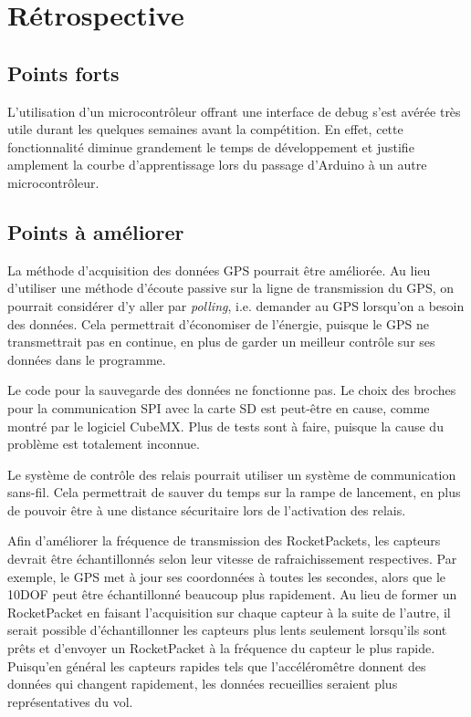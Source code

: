 \section{Rétrospective}

\subsection{Points forts}

L'utilisation d'un microcontrôleur offrant une interface de debug s'est avérée
très utile durant les quelques semaines avant la compétition. En effet, cette
fonctionnalité diminue grandement le temps de développement et justifie
amplement la courbe d'apprentissage lors du passage d'Arduino à un autre
microcontrôleur.

\subsection{Points à améliorer}

La méthode d'acquisition des données GPS pourrait être améliorée. Au lieu
d'utiliser une méthode d'écoute passive sur la ligne de transmission du GPS, on
pourrait considérer d'y aller par \textit{polling}, i.e. demander au GPS
lorsqu'on a besoin des données. Cela permettrait d'économiser de l'énergie,
puisque le GPS ne transmettrait pas en continue, en plus de garder un meilleur
contrôle sur ses données dans le programme.
\\
\par
Le code pour la sauvegarde des données ne fonctionne pas. Le choix des broches
pour la communication SPI avec la carte SD est peut-être en cause, comme montré
par le logiciel CubeMX. Plus de tests sont à faire, puisque la cause du
problème est totalement inconnue.
\\
\par
Le système de contrôle des relais pourrait utiliser un système de communication
sans-fil. Cela permettrait de sauver du temps sur la rampe de lancement, en
plus de pouvoir être à une distance sécuritaire lors de l'activation des relais.
\\
\par
Afin d'améliorer la fréquence de transmission des RocketPackets, les capteurs
devrait être échantillonnés selon leur vitesse de rafraichissement respectives.
Par exemple, le GPS met à jour ses coordonnées à toutes les secondes, alors que
le 10DOF peut être échantillonné beaucoup plus rapidement. Au lieu de former un
RocketPacket en faisant l'acquisition sur chaque capteur à la suite de l'autre,
il serait possible d'échantillonner les capteurs plus lents seulement
lorsqu'ils sont prêts et d'envoyer un RocketPacket à la fréquence du capteur le
plus rapide. Puisqu'en général les capteurs rapides tels que l'accéléromêtre
donnent des données qui changent rapidement, les données recueillies seraient
plus représentatives du vol.
